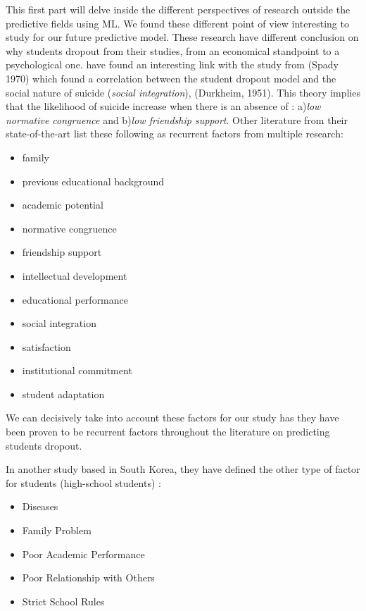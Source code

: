 \documentclass[../../main.tex]{subfiles}
\begin{document}
This first part will delve inside the different perspectives of research outside the predictive fields using ML. We found these different point of view interesting to study for our future predictive model. These research have different conclusion on why students dropout from their studies, from an economical standpoint to a psychological one.\cite{opazo_analysis_2021} have found an interesting link with the study from (Spady 1970) which found a correlation between the student dropout model and the social nature of suicide (\textit{social integration}), (Durkheim, 1951). This theory implies that the likelihood of suicide increase when there is an absence of : a)\textit{low normative congruence} and b)\textit{low friendship support}. Other literature from their state-of-the-art list these following as recurrent factors from multiple research\cite{opazo_analysis_2021,spady_dropouts_1970,tinto_dropout_1975,caspersen_teachers_2015,lidia_problema_2006,bejarano_caso_2017,sinchi_acceso_2018,cavero_voluntad_2011,velasco_alisis_nodate}: 
\begin{itemize}
    \item family
    \item previous educational background
    \item academic potential
    \item normative congruence
    \item friendship support
    \item intellectual development
    \item educational performance
    \item social integration
    \item satisfaction
    \item institutional commitment
    \item student adaptation
\end{itemize}
We can decisively take into account these factors for our study has they have been proven to be recurrent factors throughout the literature on predicting students dropout.

In another study based in South Korea, they have defined the other type of factor for students (high-school students) \cite{lee_machine_2019} :
\begin{itemize}
    \item Diseases
    \item Family Problem
    \item Poor Academic Performance
    \item Poor Relationship with Others
    \item Strict School Rules
\end{itemize}
\end{document}
